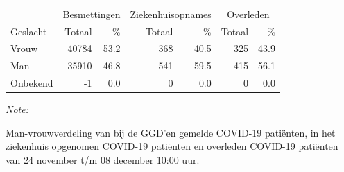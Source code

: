 \documentclass[
  english,
  man,floatsintext]{apa6}
\begin{document}
\begin{table}[H]
\centering\begingroup\fontsize{11}{13}\selectfont

\begin{threeparttable}
\begin{tabular}{lrrrrrr}
\toprule
\multicolumn{1}{c}{ } & \multicolumn{2}{c}{Besmettingen} & \multicolumn{2}{c}{Ziekenhuisopnames} & \multicolumn{2}{c}{Overleden} \\
\cmidrule(l{3pt}r{3pt}){2-3} \cmidrule(l{3pt}r{3pt}){4-5} \cmidrule(l{3pt}r{3pt}){6-7}
Geslacht & Totaal & \% & Totaal & \% & Totaal & \%\\
\midrule
Vrouw & 40784 & 53.2 & 368 & 40.5 & 325 & 43.9\\
Man & 35910 & 46.8 & 541 & 59.5 & 415 & 56.1\\
Onbekend & -1 & 0.0 & 0 & 0.0 & 0 & 0.0\\
\bottomrule
\end{tabular}
\begin{tablenotes}
\item \textit{Note: } 
\item Man-vrouwverdeling van bij de GGD’en gemelde COVID-19 patiënten, in het ziekenhuis opgenomen COVID-19 patiënten en overleden COVID-19 patiënten van 24 november t/m 08 december 10:00 uur.
\end{tablenotes}
\end{threeparttable}
\endgroup{}
\end{table}
\newpage
\end{document}
